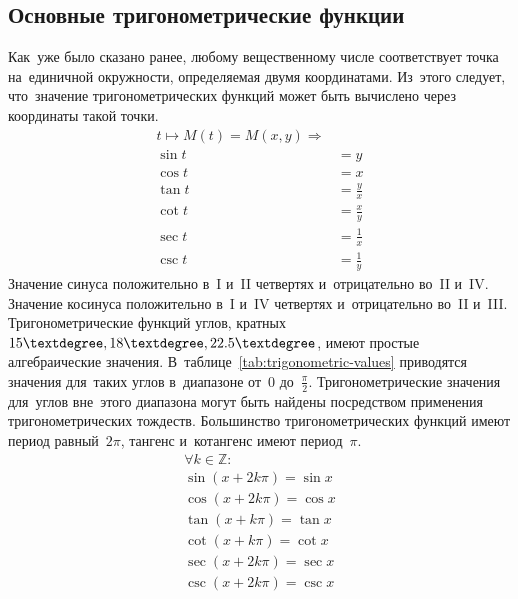 \documentclass[]{scrartcl}
\begin{document}
\subsection{Основные тригонометрические функции}
Как~уже было сказано ранее, любому вещественному числе соответствует точка на~единичной окружности, определяемая двумя координатами. Из~этого следует, что~значение тригонометрических функций может быть вычислено через координаты такой точки.
\begin{equation}\label{eq:numeric-circle-trigonometric-functions}
	\begin{aligned}
	t \mapsto M(t) = M(x,y) \Rightarrow\\
	\sin t &= y\\
	\cos t &= x\\
	\tan t &= \frac{y}{x}\\
	\cot t &= \frac{x}{y}\\
	\sec t &= \frac{1}{x}\\
	\csc t &= \frac{1}{y}
	\end{aligned}
\end{equation}
Значение синуса положительно в~I и~II четвертях и~отрицательно во~II и~IV. Значение косинуса положительно в~I и~IV четвертях и~отрицательно во~II и~III. Тригонометрические функций углов, кратных ${\textstyle 15 \textdegree, 18 \textdegree, 22.5 \textdegree}$, имеют простые алгебраические значения. В~таблице~\ref{tab:trigonometric-values} приводятся значения для~таких углов в~диапазоне от~0 до~${\textstyle \frac{\pi}{2}}$. Тригонометрические значения для~углов вне~этого диапазона могут быть найдены посредством применения тригонометрических тождеств. Большинство тригонометрических функций имеют период равный~${\textstyle 2\pi}$, тангенс и~котангенс имеют период~${\textstyle \pi}$.
\begin{equation}\label{eq:trigonometric-functions-period}
\begin{aligned}
\forall k \in \mathbb{Z}:\\
\sin(x + 2 k \pi) =\sin x\\
\cos(x + 2 k \pi) =\cos x\\
\tan(x + k \pi) =\tan x\\
\cot(x + k \pi) =\cot x\\
\sec(x + 2 k \pi) =\sec x\\
\csc(x + 2 k \pi) =\csc x\\
\end{aligned}
\end{equation}
%
\end{document}
